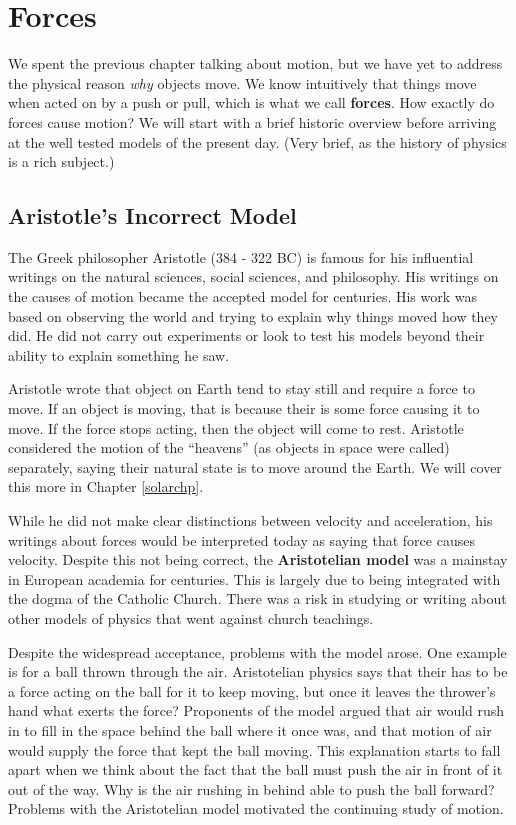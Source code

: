 \documentclass[12pt]{book}
\begin{document}
\chapter{Forces}
\setcounter{example}{1}
\addtocounter{chp}{1}

We spent the previous chapter talking about motion, but we have yet to address the physical reason \textit{why} objects move. We know intuitively that things move when acted on by a push or pull, which is what we call \textbf{forces}. How exactly do forces cause motion? We will start with a brief historic overview before arriving at the well tested models of the present day. (Very brief, as the history of physics is a rich subject.)

\section{Aristotle's Incorrect Model}

The Greek philosopher Aristotle (384 - 322 BC) is famous for his influential writings on the natural sciences, social sciences, and philosophy. His writings on the causes of motion became the accepted model for centuries. His work was based on observing the world and trying to explain why things moved how they did. He did not carry out experiments or look to test his models beyond their ability to explain something he saw.

Aristotle wrote that object on Earth tend to stay still and require a force to move. If an object is moving, that is because their is some force causing it to move. If the force stops acting, then the object will come to rest. Aristotle considered the motion of the ``heavens'' (as objects in space were called) separately, saying their natural state is to move around the Earth. We will cover this more in Chapter \ref{solarchp}.

While he did not make clear distinctions between velocity and acceleration, his writings about forces would be interpreted today as saying that force causes velocity. Despite this not being correct, the \textbf{Aristotelian model} was a mainstay in European academia for centuries. This is largely due to being integrated with the dogma of the Catholic Church. There was a risk in studying or writing about other models of physics that went against church teachings.

Despite the widespread acceptance, problems with the model arose. One example is for a ball thrown through the air. Aristotelian physics says that their has to be a force acting on the ball for it to keep moving, but once it leaves the thrower's hand what exerts the force? Proponents of the model argued that air would rush in to fill in the space behind the ball where it once was, and that motion of air would supply the force that kept the ball moving. This explanation starts to fall apart when we think about the fact that the ball must push the air in front of it out of the way. Why is the air rushing in behind able to push the ball forward? Problems with the Aristotelian model motivated the continuing study of motion.
\end{document}
